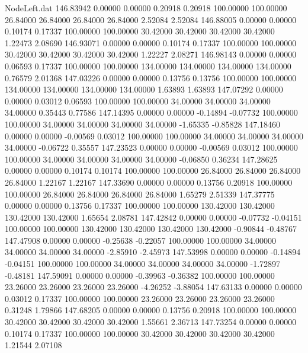 \begin{filecontents}{NodeLeft.dat}
 146.83942    0.00000    0.00000     0.20918    0.20918  100.00000  100.00000   26.84000   26.84000   26.84000   26.84000    2.52084    2.52084
 146.88005    0.00000    0.00000     0.10174    0.17337  100.00000  100.00000   30.42000   30.42000   30.42000   30.42000    1.22473    2.08690
 146.93071    0.00000    0.00000     0.10174    0.17337  100.00000  100.00000   30.42000   30.42000   30.42000   30.42000    1.22227    2.08271
 146.98143    0.00000    0.00000     0.06593    0.17337  100.00000  100.00000  134.00000  134.00000  134.00000  134.00000    0.76579    2.01368
 147.03226    0.00000    0.00000     0.13756    0.13756  100.00000  100.00000  134.00000  134.00000  134.00000  134.00000    1.63893    1.63893
 147.07292    0.00000    0.00000     0.03012    0.06593  100.00000  100.00000   34.00000   34.00000   34.00000   34.00000    0.35443    0.77586
 147.14395    0.00000    0.00000    -0.14894   -0.07732  100.00000  100.00000   34.00000   34.00000   34.00000   34.00000   -1.65335   -0.85828
 147.18460    0.00000    0.00000    -0.00569    0.03012  100.00000  100.00000   34.00000   34.00000   34.00000   34.00000   -0.06722    0.35557
 147.23523    0.00000    0.00000    -0.00569    0.03012  100.00000  100.00000   34.00000   34.00000   34.00000   34.00000   -0.06850    0.36234
 147.28625    0.00000    0.00000     0.10174    0.10174  100.00000  100.00000   26.84000   26.84000   26.84000   26.84000    1.22167    1.22167
 147.33690    0.00000    0.00000     0.13756    0.20918  100.00000  100.00000   26.84000   26.84000   26.84000   26.84000    1.65279    2.51339
 147.37775    0.00000    0.00000     0.13756    0.17337  100.00000  100.00000  130.42000  130.42000  130.42000  130.42000    1.65654    2.08781
 147.42842    0.00000    0.00000    -0.07732   -0.04151  100.00000  100.00000  130.42000  130.42000  130.42000  130.42000   -0.90844   -0.48767
 147.47908    0.00000    0.00000    -0.25638   -0.22057  100.00000  100.00000   34.00000   34.00000   34.00000   34.00000   -2.85910   -2.45973
 147.53998    0.00000    0.00000    -0.14894   -0.04151  100.00000  100.00000   34.00000   34.00000   34.00000   34.00000   -1.72897   -0.48181
 147.59091    0.00000    0.00000    -0.39963   -0.36382  100.00000  100.00000   23.26000   23.26000   23.26000   23.26000   -4.26252   -3.88054
 147.63133    0.00000    0.00000     0.03012    0.17337  100.00000  100.00000   23.26000   23.26000   23.26000   23.26000    0.31248    1.79866
 147.68205    0.00000    0.00000     0.13756    0.20918  100.00000  100.00000   30.42000   30.42000   30.42000   30.42000    1.55661    2.36713
 147.73254    0.00000    0.00000     0.10174    0.17337  100.00000  100.00000   30.42000   30.42000   30.42000   30.42000    1.21544    2.07108

\end{filecontents}
